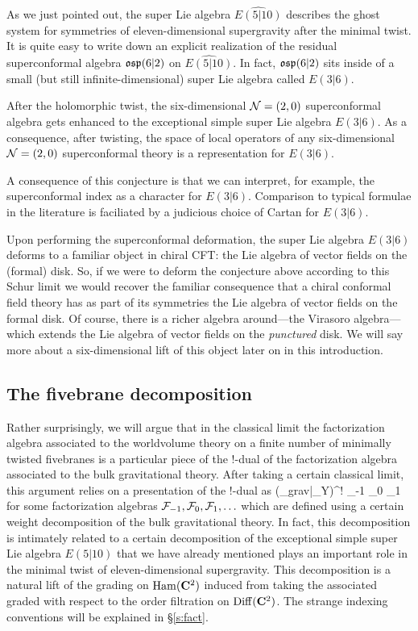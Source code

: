 As we just pointed out, the super Lie algebra $\widehat {E(5|10)}$ describes the ghost system for symmetries of eleven-dimensional supergravity after the minimal twist.
It is quite easy to write down an explicit realization of the residual superconformal algebra $\mathfrak{osp}(6|2)$ on $\widehat {E(5|10)}$.
In fact, $\mathfrak{osp}(6|2)$ sits inside of a small (but still infinite-dimensional) super Lie algebra called $E(3|6)$. 

\begin{conj}
After the holomorphic twist, the six-dimensional $\mathcal N = (2,0) $ superconformal algebra gets enhanced to the exceptional simple super Lie algebra $E(3|6)$.
As a consequence, after twisting, the space of local operators of any six-dimensional $\mathcal N=(2,0)$ superconformal theory is a representation for $E(3|6)$.
\end{conj}

A consequence of this conjecture is that we can interpret, for example, the superconformal index as a character for $E(3|6)$. Comparison to typical formulae in the literature is faciliated by a judicious choice of Cartan for $E(3|6)$.

Upon performing the superconformal deformation, the super Lie algebra $E(3|6)$ deforms to a familiar object in chiral CFT: the Lie algebra of vector fields on the (formal) disk.
So, if we were to deform the conjecture above according to this Schur limit we would recover the familiar consequence that a chiral conformal field theory has as part of its symmetries the Lie algebra of vector fields on the formal disk.
Of course, there is a richer algebra around---the Virasoro algebra---which extends the Lie algebra of vector fields on the {\em punctured} disk. 
We will say more about a six-dimensional lift of this object later on in this introduction.

\subsection{The fivebrane decomposition}
Rather surprisingly, we will argue that in the classical limit the factorization algebra associated to the worldvolume theory on a finite number of minimally twisted fivebranes is a particular piece of the $!$-dual of the factorization algebra associated to the bulk gravitational theory.
After taking a certain classical limit, this argument relies on a presentation of the $!$-dual as
\beqn
(\Obs_{grav}|_{Y})^{!} \simeq \cF_{-1} \otimes \cF_0 \otimes \cF_1 \otimes \cdots 
\eeqn
for some factorization algebras $\mathcal F_{-1},\mathcal F_0, \mathcal F_{1},\ldots$ which are defined using a certain weight decomposition of the bulk gravitational theory.
In fact, this decomposition is intimately related to a certain decomposition of the exceptional simple super Lie algebra $E(5|10)$ that we have already mentioned plays an important role in the minimal twist of eleven-dimensional supergravity. This decomposition is a natural lift of the grading on $\operatorname{Ham}(\mathbf{C}^{2})$ induced from taking the associated graded with respect to the order filtration on $\operatorname{Diff} (\mathbf{C}^{2})$. The strange indexing conventions will be explained in \S\ref{s:fact}.

